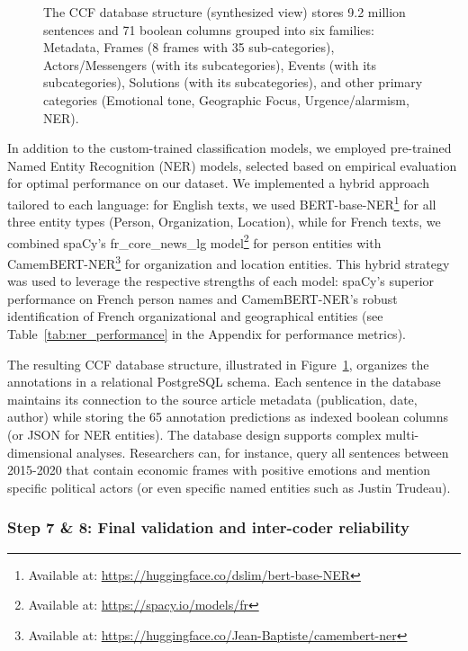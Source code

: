\begin{figure}[b!]
{\begin{tikzpicture}
\end{tikzpicture}
}
\caption{The CCF database structure (synthesized view) stores 9.2 million sentences and 71 boolean columns grouped into six families: Metadata, Frames (8 frames with 35 sub-categories), Actors/Messengers (with its subcategories), Events (with its subcategories), Solutions (with its subcategories), and other primary categories (Emotional tone, Geographic Focus, Urgence/alarmism, NER).}
\label{fig:database_structure}
\end{figure}

In addition to the custom-trained classification models, we employed pre-trained Named Entity Recognition (NER) models, selected based on empirical evaluation for optimal performance on our dataset. We implemented a hybrid approach tailored to each language: for English texts, we used BERT-base-NER\footnote{Available at: \url{https://huggingface.co/dslim/bert-base-NER}} for all three entity types (Person, Organization, Location), while for French texts, we combined spaCy's fr\_core\_news\_lg model\footnote{Available at: \url{https://spacy.io/models/fr}} for person entities with CamemBERT-NER\footnote{Available at: \url{https://huggingface.co/Jean-Baptiste/camembert-ner}} for organization and location entities. This hybrid strategy was used to leverage the respective strengths of each model: spaCy's superior performance on French person names and CamemBERT-NER's robust identification of French organizational and geographical entities (see Table~\ref{tab:ner_performance} in the Appendix for performance metrics).

The resulting CCF database structure, illustrated in Figure~\ref{fig:database_structure}, organizes the annotations in a relational PostgreSQL schema. Each sentence in the database maintains its connection to the source article metadata (publication, date, author) while storing the 65 annotation predictions as indexed boolean columns (or JSON for NER entities). The database design supports complex multi-dimensional analyses. Researchers can, for instance, query all sentences between 2015-2020 that contain economic frames with positive emotions and mention specific political actors (or even specific named entities such as Justin Trudeau).

\subsubsection{Step 7 \& 8: Final validation and inter-coder reliability}

